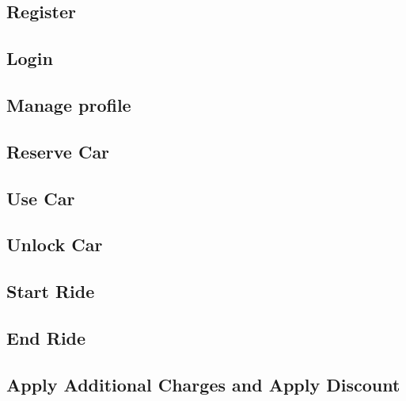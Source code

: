 \subsection{Register}


\subsection{Login}


\subsection{Manage profile}


\subsection{Reserve Car}


\subsection{Use Car}


\subsection{Unlock Car} \label{unlock_car_section}


\subsection{Start Ride} \label{start_ride_section}


\subsection{End Ride} \label{end_ride_section}


\subsection{Apply Additional Charges and Apply Discount}


